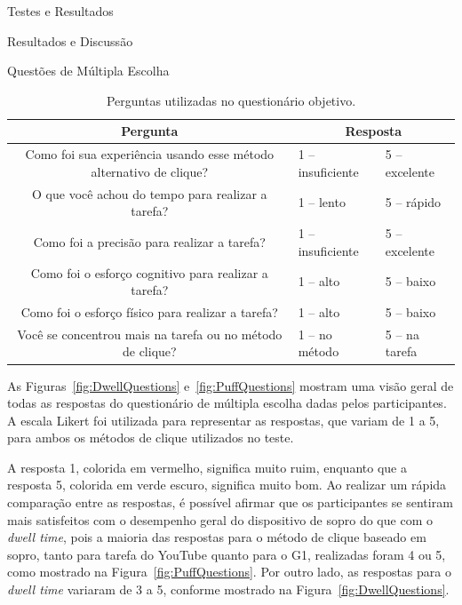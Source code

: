 \begin{chapter}{Testes e Resultados}
\begin{section}{Resultados e Discussão}
\begin{subsection}{Questões de Múltipla Escolha}
\begin{table}[!h]
\centering
\small
\def\arraystretch{1.0}
\begin{tabular}{c|ll}
	\hline
	\hline
	 \textbf{Pergunta} &\multicolumn{2}{c}{\textbf{Resposta}} \\
	\hline
	 Como foi sua experiência usando esse método alternativo de clique? & 1 -- insuficiente        & 5 -- excelente   \\
	 O que você achou do tempo para realizar a tarefa?                  & 1 -- lento               & 5 -- rápido      \\
	 Como foi a precisão para realizar a tarefa?                        & 1 -- insuficiente        & 5 -- excelente   \\
	 Como foi o esforço cognitivo para realizar a tarefa?               & 1 -- alto                & 5 -- baixo       \\
	 Como foi o esforço físico para realizar a tarefa?                  & 1 -- alto                & 5 -- baixo       \\
	 Você se concentrou mais na tarefa ou no método de clique?          & 1 -- no método           & 5 -- na tarefa   \\
	\hline
	\hline
\end{tabular}
\caption{Perguntas utilizadas no questionário objetivo.}
\label{tab:quest}
\end{table}

As Figuras~\ref{fig:DwellQuestions} e~\ref{fig:PuffQuestions} mostram uma visão
geral de todas as respostas do questionário de múltipla escolha dadas pelos
participantes. A escala Likert foi utilizada para representar as respostas, que
variam de 1 a 5, para ambos os métodos de clique utilizados no teste.

A resposta 1, colorida em vermelho, significa muito ruim,
enquanto que a resposta 5, colorida em verde escuro, significa muito bom. Ao
realizar um rápida comparação entre as respostas, é possível afirmar que os
participantes se sentiram mais satisfeitos com o desempenho geral do dispositivo
de sopro do que com o \textit{dwell time}, pois a maioria das respostas
para o método de clique baseado em sopro, tanto para tarefa do YouTube quanto
para o G1, realizadas foram 4
ou 5, como mostrado na Figura~\ref{fig:PuffQuestions}. Por outro lado, as 
respostas para o \textit{dwell time} variaram de 3 a 5, conforme mostrado na
Figura~\ref{fig:DwellQuestions}.  


\end{subsection}
\end{section}
\end{chapter}
